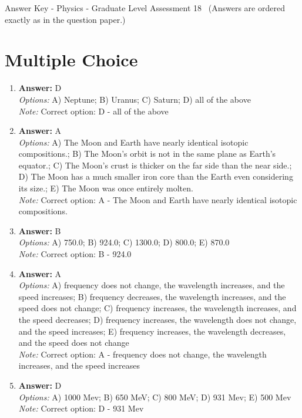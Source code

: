 \documentclass[12pt]{article}
\begin{document}
\begin{center}
Answer Key - Physics - Graduate Level Assessment 18 \
\small (Answers are ordered exactly as in the question paper.)
\end{center}

\section*{Multiple Choice}
\begin{enumerate}[label=\arabic*.]
\item \textbf{Answer:} D
\\ \textit{Options:} A) Neptune; B) Uranus; C) Saturn; D) all of the above
\\ \textit{Note:} Correct option: D - all of the above
\item \textbf{Answer:} A
\\ \textit{Options:} A) The Moon and Earth have nearly identical isotopic compositions.; B) The Moon's orbit is not in the same plane as Earth's equator.; C) The Moon's crust is thicker on the far side than the near side.; D) The Moon has a much smaller iron core than the Earth even considering its size.; E) The Moon was once entirely molten.
\\ \textit{Note:} Correct option: A - The Moon and Earth have nearly identical isotopic compositions.
\item \textbf{Answer:} B
\\ \textit{Options:} A) 750.0; B) 924.0; C) 1300.0; D) 800.0; E) 870.0
\\ \textit{Note:} Correct option: B - 924.0
\item \textbf{Answer:} A
\\ \textit{Options:} A) frequency does not change, the wavelength increases, and the speed increases; B) frequency decreases, the wavelength increases, and the speed does not change; C) frequency increases, the wavelength increases, and the speed decreases; D) frequency increases, the wavelength does not change, and the speed increases; E) frequency increases, the wavelength decreases, and the speed does not change
\\ \textit{Note:} Correct option: A - frequency does not change, the wavelength increases, and the speed increases
\item \textbf{Answer:} D
\\ \textit{Options:} A) 1000 Mev; B) 650 MeV; C) 800 MeV; D) 931 Mev; E) 500 Mev
\\ \textit{Note:} Correct option: D - 931 Mev
\end{enumerate}
\end{document}
